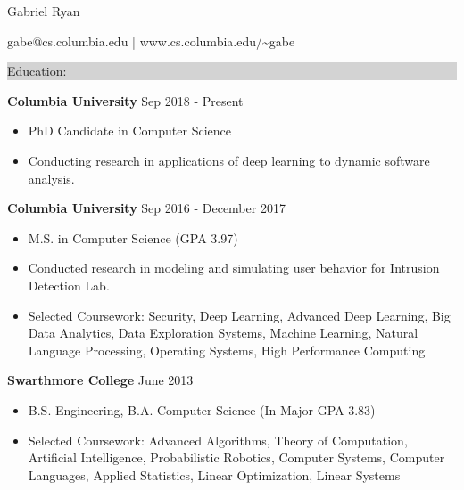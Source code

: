\documentclass{article} %
\newcommand{\rsection}[1]{
\hspace{-0.4cm}
\colorbox{lightgrey}{
\begin{minipage}{1.07\linewidth}
\vspace{0.25cm}
\fontsize{14pt}{16pt}\selectfont #1 
\vspace{0.15cm}
\end{minipage}
}
\vspace*{-0.2cm}
}
\newcommand{\rjob}[2]{
\vspace{0.1cm}
\hspace*{-0.3cm}  
{\fontsize{10pt}{12pt}\selectfont #1} \hfill #2 
\vspace*{0.1cm} 
\hspace*{-1.2cm}
}
\newenvironment{ritemize}{
\hspace*{-0.8cm} 
\begin{minipage}{1.05\linewidth}
\begin{itemize}
}{
\end{itemize}
\end{minipage}
\vspace{-0.2cm}
}
\newcommand{\ritem}{
\item[-]
}
\begin{document}
\hspace*{-0.45cm} 
{\fontsize{22pt}{22pt}\selectfont Gabriel Ryan}\\
\begin{minipage}{\linewidth}
\vspace{0.1cm}
  {\fontsize{12}{12}\selectfont
    gabe@cs.columbia.edu | www.cs.columbia.edu/\textasciitilde gabe
  }
\end{minipage}
\vspace{-0.15cm}


\rsection{Education:} 

\rjob{\textbf{Columbia University}}{Sep 2018 - Present}\\
\begin{ritemize}
\ritem PhD Candidate in Computer Science
\ritem Conducting research in applications of deep learning to dynamic software analysis.
\end{ritemize}

\rjob{\textbf{Columbia University}}{Sep 2016 - December 2017}\\
\begin{ritemize}
  \ritem M.S. in Computer Science (GPA 3.97)
  \ritem Conducted research in modeling and simulating user behavior for Intrusion Detection Lab.
  \ritem Selected Coursework: Security, Deep Learning, Advanced Deep Learning, Big Data Analytics, Data Exploration Systems, Machine Learning, Natural Language Processing, Operating Systems, High Performance Computing
\end{ritemize}

\rjob{\textbf{Swarthmore College}}{June 2013}\\
\begin{ritemize}
    \ritem B.S. Engineering, B.A. Computer Science (In Major GPA 3.83)
\ritem Selected Coursework: Advanced Algorithms, Theory of Computation, Artificial Intelligence, Probabilistic Robotics, Computer Systems, Computer Languages, Applied Statistics, Linear Optimization, Linear Systems
\end{ritemize}
\vspace{0.25cm}
\end{document}
